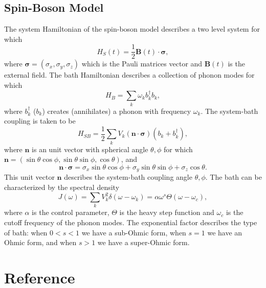 \documentclass[11pt]{book}
\begin{document}
\section{Spin-Boson Model}
\label{sec:orge256b85}
The system Hamiltonian of the spin-boson model describes a two level
system for which
\begin{equation}
H_S(t)=\frac{1}{2}\bm{B}(t)\cdot\bm{\sigma},
\end{equation}
where \(\bm{\sigma}=(\sigma_x,\sigma_y,\sigma_z)\) which is the Pauli
matrices vector and \(\bm{B}(t)\) is the external field. The bath
Hamiltonian describes a collection of phonon modes for which
\begin{equation}
H_B=\sum_k\omega_kb_k^{\dag}b_k,
\end{equation}
where \(b_k^{\dag}\) (\(b_k\)) creates (annihilates) a phonon with
frequency \(\omega_k\). The system-bath coupling is taken to be
\begin{equation}
H_{SB}=\frac{1}{2}\sum_kV_k(\bm{n}\cdot\bm{\sigma})(b_k+b_k^{\dag}),
\end{equation}
where \(\bm{n}\) is an unit vector with spherical angle \(\theta,\phi\)
for which \(\bm{n}=(\sin\theta\cos\phi,\sin\theta\sin\phi,\cos\theta)\),
and
\begin{equation}
\bm{n}\cdot\bm{\sigma}=\sigma_x\sin\theta\cos\phi+
\sigma_y\sin\theta\sin\phi+\sigma_z\cos\theta.
\end{equation}
This unit vector \(\bm{n}\) describes the system-bath coupling angle
\(\theta,\phi\). The bath can be characterized by the spectral density
\begin{equation}
J(\omega)=\sum_kV_k^2\delta(\omega-\omega_k)=
\alpha\omega^s\Theta(\omega-\omega_c),
\end{equation}
where \(\alpha\) is the control parameter, \(\Theta\) is the heavy step
function and \(\omega_c\) is the cutoff frequency of the phonon modes.
The exponential factor describes the type of bath: when \(0<s<1\) we
have a sub-Ohmic form, when \(s=1\) we have an Ohmic form, and when
\(s>1\) we have a super-Ohmic form.

\chapter{Reference}
\label{sec:orgfc59349}


\end{document}
